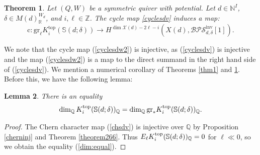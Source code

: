 \documentclass [11pt,oneside,a4paper,mathscr]{amsart}
\newtheorem{thm}{Theorem}[section]
\newtheorem{lemma}[thm]{Lemma}
\theoremstyle{definition}
\newcommand{\X}{\mathscr{X}}
\begin{document}
\begin{thm}\label{thm2}
Let $(Q, W)$ be a symmetric quiver with 
potential. 
Let $d\in \mathbb{N}^I$, $\delta\in M(d)^{W_d}_\mathbb{R}$, and $i, \ell\in\mathbb{Z}$.
The cycle map \eqref{cyclesdv} induces a map:  
\begin{equation}\label{cyclesdw2}
\mathrm{c}\colon \mathrm{gr}_\ell K_i^{\mathrm{top}}\left(\mathbb{S}(d; \delta)\right)\to 
H^{\dim \X(d)-2\ell-i}\left(X(d), \mathcal{BPS}_{d,\delta}^{\mathrm{inv}}[1]\right).
\end{equation} 
\end{thm}













We note that the cycle map (\ref{cyclesdw2}) is injective, 
as (\ref{cyclesdv}) is injective
and the map (\ref{cyclesdw2}) is 
a map to the direct summand in the right hand side 
of (\ref{cyclesdv}). 
We mention a numerical corollary of Theorems \ref{thm1} and \ref{thm2}. 
Before this, we have the following lemma: 
\begin{lemma}\label{thm2inj}
There is an equality
    \begin{align}\label{dim:equal}
\dim_{\mathbb{Q}}K_i^{\rm{top}}(\mathbb{S}(d; \delta))_{\mathbb{Q}}
=\dim_{\mathbb{Q}}\mathrm{gr}_{\ast}K_i^{\rm{top}}(\mathbb{S}(d; \delta))_{\mathbb{Q}}. 
\end{align}
\end{lemma}
\begin{proof}
The Chern 
character map (\ref{chsdv}) is injective 
over $\mathbb{Q}$ by 
Proposition \ref{cherninj} and Theorem \ref{theorem266}.
Thus $E_{\ell}K_i^{\rm{top}}(\mathbb{S}(d; \delta))_{\mathbb{Q}}=0$ for $\ell \ll 0$, 
so we obtain the equality (\ref{dim:equal}). 
\end{proof}
\end{document}
